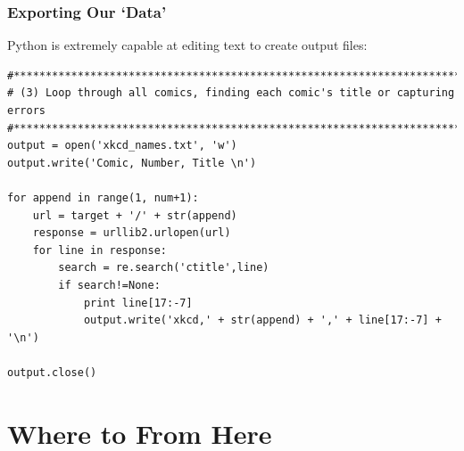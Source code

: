\documentclass[10pt,letterpaper,subeqn]{beamer}
\begin{document}
\begin{frame}[fragile]
 \frametitle{Exporting Our `Data'}
Python is extremely capable at editing text to create output files:
\vspace{5mm}

 \begin{verbatim}
#*******************************************************************************
# (3) Loop through all comics, finding each comic's title or capturing errors
#*******************************************************************************
output = open('xkcd_names.txt', 'w')
output.write('Comic, Number, Title \n')

for append in range(1, num+1):
    url = target + '/' + str(append)
    response = urllib2.urlopen(url)
    for line in response:
        search = re.search('ctitle',line)
        if search!=None:
            print line[17:-7]
            output.write('xkcd,' + str(append) + ',' + line[17:-7] + '\n')

output.close()
\end{verbatim}
\end{frame}

\section{Where to From Here}

\end{document}
